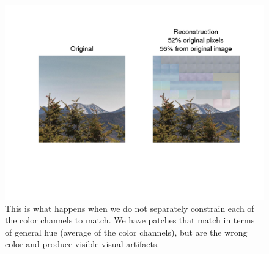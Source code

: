  \begin{figure}
\includegraphics[width=1\linewidth]{Figures/197.png}
\caption{This is what happens when we do not separately constrain each of the color channels to match. We have patches that match in terms of general hue (average of the color channels), but are the wrong color and produce visible visual artifacts.}
\label{fig:colProblem}
\end{figure}

